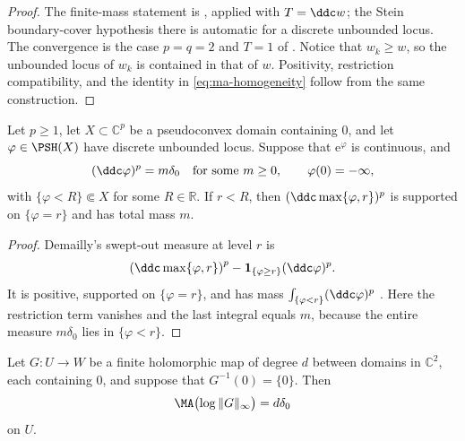 \documentclass[11pt,a4paper]{article}
\newcommand{\e}{\mathrm e}
\begin{document}
\begin{proof}
The finite-mass statement is \cite[Chapter~III, Proposition~4.1]{DemaillyCADG}, applied with $T=\ddc w$; the Stein boundary-cover hypothesis there is automatic for a discrete unbounded locus. The convergence is the case $p=q=2$ and $T=1$ of \cite[Chapter~III, Corollary~4.3]{DemaillyCADG}. Notice that $w_k\ge w$, so the unbounded locus of $w_k$ is contained in that of $w$. Positivity, restriction compatibility, and the identity in \eqref{eq:ma-homogeneity} follow from the same construction.
\end{proof}

\begin{lemma}\label{lem:sweeping}
Let $p\ge1$, let $X\subset\mathbb C^p$ be a pseudoconvex domain containing $0$, and let $\varphi\in\PSH(X)$ have discrete unbounded locus. Suppose that $\e^\varphi$ is continuous, and 
\[
  (\ddc\varphi)^p=m\delta_0 \quad\textup{for some }m\ge0,\qquad \varphi(0)=-\infty,
\]
with $\{\varphi<R\}\Subset X$ for some $R\in\mathbb R$. If $r<R$, then $(\ddc\max\{\varphi,r\})^p$ is supported on $\{\varphi=r\}$ and has total mass $m$.
\end{lemma}

\begin{proof}
Demailly's swept-out measure at level $r$ is
\[
  \left(\ddc\max\{\varphi,r\}\right)^p-\mathbf 1_{\{\varphi\ge r\}}(\ddc\varphi)^p.
\]
It is positive, supported on $\{\varphi=r\}$, and has mass $\int_{\{\varphi<r\}}(\ddc\varphi)^p$ \cite[Chapter~III, formulas~(6.1)--(6.2)]{DemaillyCADG}. Here the restriction term vanishes and the last integral equals $m$, because the entire measure $m\delta_0$ lies in $\{\varphi<r\}$.
\end{proof}

\begin{lemma}\label{lem:finite-mass}
Let $G\colon U\to W$ be a finite holomorphic map of degree $d$ between domains in $\mathbb C^2$, each containing $0$, and suppose that $G^{-1}(0)=\{0\}$. Then
\begin{equation}\label{eq:finite-mass}
  \MA\bigl(\log\|G\|_\infty\bigr)=d\delta_0
\end{equation}
on $U$.
\end{lemma}
\end{document}
